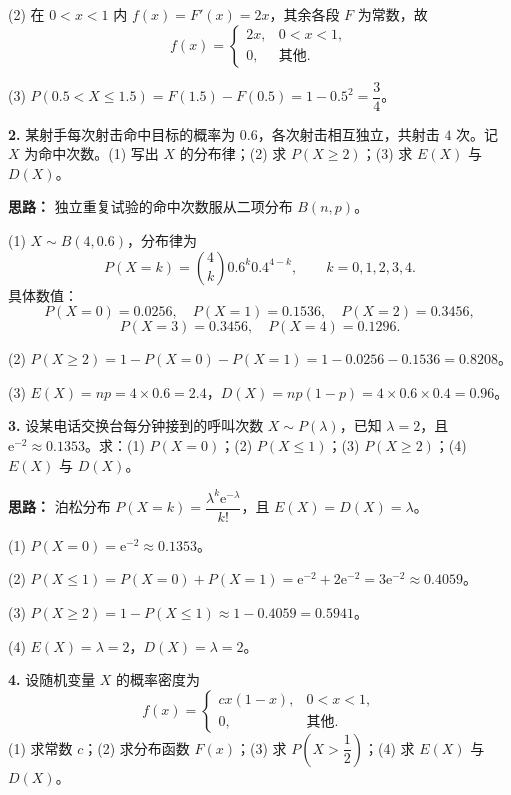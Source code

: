 (2) 在 $0<x<1$ 内 $f(x)=F'(x)=2x$，其余各段 $F$ 为常数，故
\[
f(x)=\begin{cases}
2x, & 0<x<1,\\
0, & \text{其他}.
\end{cases}
\]

(3) $P(0.5<X\leq 1.5)=F(1.5)-F(0.5)=1-0.5^2=\dfrac34$。

\else \answerarea[8] \fi%

\textbf{2.} 某射手每次射击命中目标的概率为 $0.6$，各次射击相互独立，共射击 $4$ 次。记 $X$ 为命中次数。(1) 写出 $X$ 的分布律；(2) 求 $P(X\geq 2)$；(3) 求 $E(X)$ 与 $D(X)$。

\ifshowsolutions%
\textbf{思路：} 独立重复试验的命中次数服从二项分布 $B(n,p)$。

(1) $X\sim B(4,0.6)$，分布律为
\[
P(X=k)=\binom{4}{k}0.6^k0.4^{4-k},\qquad k=0,1,2,3,4.
\]
具体数值：
\[
P(X=0)=0.0256,\quad P(X=1)=0.1536,\quad P(X=2)=0.3456,
\]
\[
P(X=3)=0.3456,\quad P(X=4)=0.1296.
\]

(2) $P(X\geq2)=1-P(X=0)-P(X=1)=1-0.0256-0.1536=0.8208$。

(3) $E(X)=np=4\times0.6=2.4$，$D(X)=np(1-p)=4\times0.6\times0.4=0.96$。

\else \answerarea[8] \fi%

\textbf{3.} 设某电话交换台每分钟接到的呼叫次数 $X\sim P(\lambda)$，已知 $\lambda=2$，且 $\mathrm{e}^{-2}\approx0.1353$。求：(1) $P(X=0)$；(2) $P(X\leq1)$；(3) $P(X\geq2)$；(4) $E(X)$ 与 $D(X)$。

\ifshowsolutions%
\textbf{思路：} 泊松分布 $P(X=k)=\dfrac{\lambda^k\mathrm{e}^{-\lambda}}{k!}$，且 $E(X)=D(X)=\lambda$。

(1) $P(X=0)=\mathrm{e}^{-2}\approx0.1353$。

(2) $P(X\leq1)=P(X=0)+P(X=1)=\mathrm{e}^{-2}+2\mathrm{e}^{-2}=3\mathrm{e}^{-2}\approx0.4059$。

(3) $P(X\geq2)=1-P(X\leq1)\approx1-0.4059=0.5941$。

(4) $E(X)=\lambda=2$，$D(X)=\lambda=2$。

\else \answerarea[8] \fi%

\textbf{4.} 设随机变量 $X$ 的概率密度为
\[
f(x)=\begin{cases}
cx(1-x), & 0<x<1,\\
0, & \text{其他}.
\end{cases}
\]
(1) 求常数 $c$；(2) 求分布函数 $F(x)$；(3) 求 $P\!\left(X>\dfrac12\right)$；(4) 求 $E(X)$ 与 $D(X)$。


